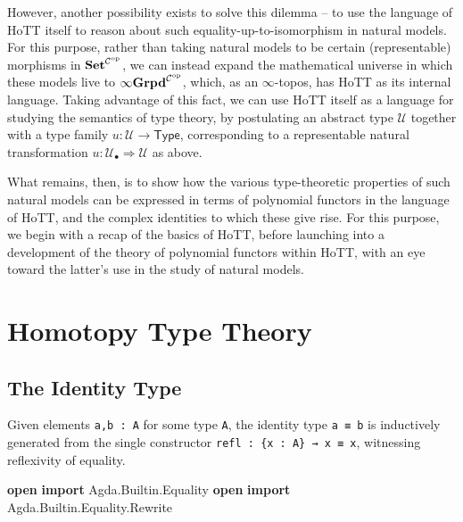 \documentclass[
  11pt,
  oneside,
  article]{memoir}
\newenvironment{Shaded}{}{}
\newcommand{\KeywordTok}[1]{\textcolor[rgb]{0.00,0.44,0.13}{\textbf{#1}}}
\newcommand{\NormalTok}[1]{#1}
\newcommand{\OtherTok}[1]{\textcolor[rgb]{0.00,0.44,0.13}{#1}}
\theoremstyle{definition}
\theoremstyle{plain}
\newcommand{\Cat}[1]{\mathbf{#1}}%
\newcommand{\op}{^\tn{op}}
\newcommand{\tn}[1]{\textnormal{#1}}
\newcommand{\smset}{\Cat{Set}}
\newcommand{\0}{\textsf{0}}
\newcommand{\1}{\tn{\textsf{1}}}
\begin{document}
However, another possibility exists to solve this dilemma -- to use the
language of HoTT itself to reason about such equality-up-to-isomorphism
in natural models. For this purpose, rather than taking natural models
to be certain (representable) morphisms in
\(\smset^{\mathcal{C}\op}\), we can instead expand the
mathematical universe in which these models live to
\(\mathbf{\infty Grpd}^{\mathcal{C}\op}\), which, as an
\(\infty\)-topos, has HoTT as its internal language. Taking advantage of
this fact, we can use HoTT itself as a language for studying the
semantics of type theory, by postulating an abstract type
\(\mathcal{U}\) together with a type family
\(u : \mathcal{U} \to \mathsf{Type}\), corresponding to a representable
natural transformation
\(u : \mathcal{U}_\bullet \Rightarrow \mathcal{U}\) as above.

What remains, then, is to show how the various type-theoretic properties
of such natural models can be expressed in terms of polynomial functors
in the language of HoTT, and the complex identities to which these give
rise. For this purpose, we begin with a recap of the basics of HoTT,
before launching into a development of the theory of polynomial functors
within HoTT, with an eye toward the latter's use in the study of natural
models.

\section{Homotopy Type Theory}\label{homotopy-type-theory}

\subsection{The Identity Type}\label{the-identity-type}

Given elements \texttt{a,b\ :\ A} for some type \texttt{A}, the identity
type \texttt{a\ ≡\ b} is inductively generated from the single
constructor \texttt{refl\ :\ \{x\ :\ A\}\ →\ x\ ≡\ x}, witnessing
reflexivity of equality.

\begin{Shaded}
\begin{Highlighting}[]
\KeywordTok{open} \KeywordTok{import}\NormalTok{ Agda}\OtherTok{.}\NormalTok{Builtin}\OtherTok{.}\NormalTok{Equality}
\KeywordTok{open} \KeywordTok{import}\NormalTok{ Agda}\OtherTok{.}\NormalTok{Builtin}\OtherTok{.}\NormalTok{Equality}\OtherTok{.}\NormalTok{Rewrite}
\end{Highlighting}
\end{Shaded}
\end{document}
